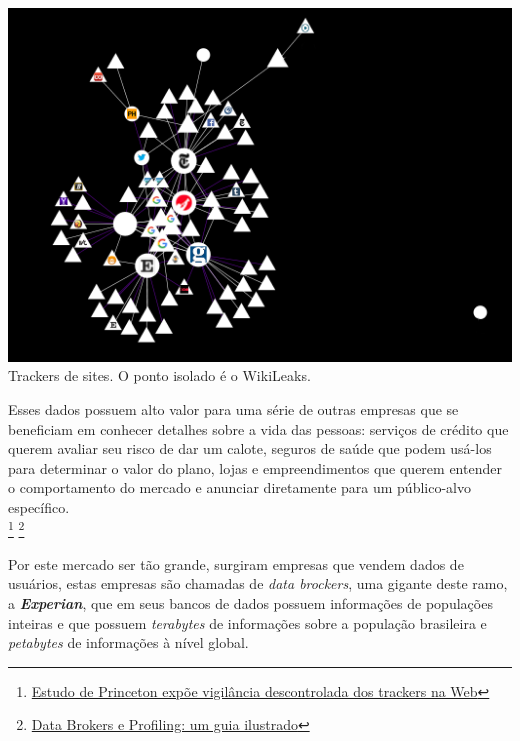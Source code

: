 \documentclass[12pt, letterpaper, DejaVuSansMono:12]{report}
\begin{document}
	\begin{center} %
		\includegraphics[scale=0.7]{trackers1.png}\\
		\footnotesize Trackers de sites. O ponto isolado é o WikiLeaks.
	\end{center}


	Esses dados possuem alto valor para uma série de outras empresas que se beneficiam em conhecer detalhes sobre a vida das pessoas: serviços de crédito que querem avaliar seu risco de dar um calote, seguros de saúde que podem usá-los para determinar o valor do plano, lojas e empreendimentos que querem entender o comportamento do mercado e anunciar diretamente para um público-alvo específico.\\

\footnote{\href{https://antivigilancia.org/pt/2016/06/webcensus/}{Estudo de Princeton expõe vigilância descontrolada dos trackers na Web}}
\footnote{\href{https://antivigilancia.org/pt/2015/05/data-brokers-e-profiling-um-guia-ilustrado/}{Data Brokers e Profiling: um guia ilustrado}}

	Por este mercado ser tão grande, surgiram empresas que vendem dados de usuários, estas empresas são chamadas de \textit{data brockers}, uma gigante deste ramo, a \textbf{\textit{Experian}}, que em seus bancos de dados possuem informações de populações inteiras e que possuem \textit{terabytes} de informações sobre a população brasileira e \textit{petabytes} de informações à nível global.\\
\end{document}
